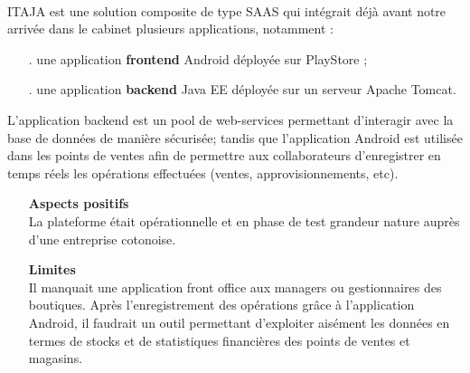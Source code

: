 \documentclass[12pt]{report}
\begin{document}
	\paragraph{}
	  ITAJA est une solution composite de type \gls{SAAS} qui intégrait déjà avant notre arrivée dans le cabinet plusieurs applications, notamment :
	  \begin{itemize}
	    \item[.] une application \textbf{frontend} Android déployée sur PlayStore ;
	    \item[.] une application \textbf{backend} Java EE déployée sur un serveur Apache Tomcat.
	  \end{itemize}
	  
	  L’application backend est un pool de web-services permettant d’interagir avec la base de données de manière sécurisée; tandis que l’application Android est utilisée dans les points de ventes afin de permettre aux collaborateurs d’enregistrer en temps réels les opérations effectuées (ventes, approvisionnements, etc).
	  
	  \begin{itemize}
	    \item[\ding{42}] \textbf{Aspects positifs}\\
	      La plateforme était opérationnelle et en phase de test grandeur nature auprès d’une entreprise cotonoise.

	    \item[\ding{42}] \textbf{Limites}\\
	      Il manquait une application front office aux managers ou gestionnaires des boutiques. Après l'enregistrement des opérations grâce à l'application Android, il faudrait un outil permettant d'exploiter aisément les données en termes de stocks et de statistiques financières des points de ventes et magasins.
	 \end{itemize}
	
\end{document}
